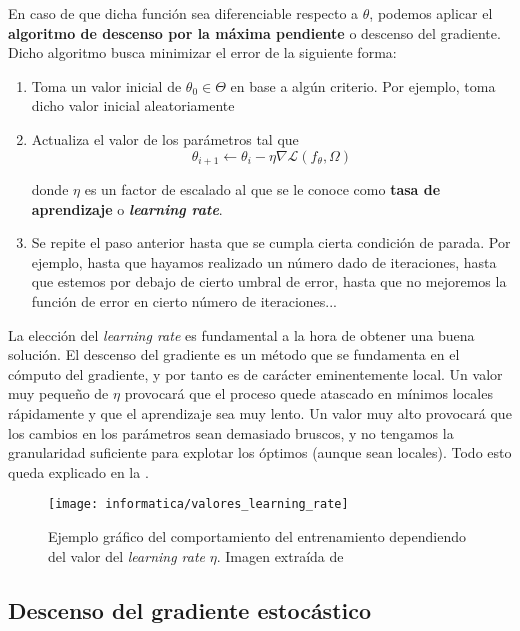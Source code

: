 En caso de que dicha función sea diferenciable respecto a $\theta$, podemos aplicar el \textbf{algoritmo de descenso por la máxima pendiente} o descenso del gradiente. Dicho algoritmo busca minimizar el error de la siguiente forma:

\begin{enumerate}
    \item Toma un valor inicial de $\theta_0 \in \Theta$ en base a algún criterio. Por ejemplo, toma dicho valor inicial aleatoriamente
    \item Actualiza el valor de los parámetros tal que
        \begin{equation}
            \theta_{i + 1} \leftarrow \theta_i - \eta \nabla \mathcal{L}(f_\theta, \Omega)
        \end{equation}

        donde $\eta$ es un factor de escalado al que se le conoce como \textbf{tasa de aprendizaje} o \textbf{\textit{learning rate}}.
    \item Se repite el paso anterior hasta que se cumpla cierta condición de parada. Por ejemplo, hasta que hayamos realizado un número dado de iteraciones, hasta que estemos por debajo de cierto umbral de error, hasta que no mejoremos la función de error en cierto número de iteraciones...
\end{enumerate}

La elección del \textit{learning rate} es fundamental a la hora de obtener una buena solución. El descenso del gradiente es un método que se fundamenta en el cómputo del gradiente, y por tanto es de carácter eminentemente local. Un valor muy pequeño de $\eta$ provocará que el proceso quede atascado en mínimos locales rápidamente y que el aprendizaje sea muy lento. Un valor muy alto provocará que los cambios en los parámetros sean demasiado bruscos, y no tengamos la granularidad suficiente para explotar los óptimos (aunque sean locales). Todo esto queda explicado en la .

\begin{figure}[h]
    \centering
    \texttt{[image: informatica/valores\_learning\_rate]}
    \caption{Ejemplo gráfico del comportamiento del entrenamiento dependiendo del valor del \textit{learning rate} $\eta$. Imagen extraída de \cite{informatica:libro_clase_aprendizaje_automatico}}
    \label{img:valores_learning_rate}
\end{figure}

\subsection{Descenso del gradiente estocástico}

